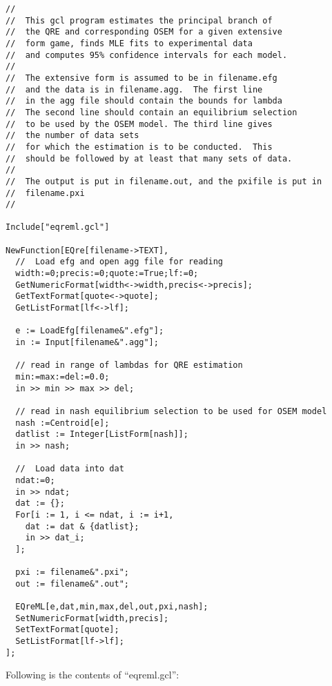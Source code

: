 {\scriptsize
\begin{verbatim}
//
//  This gcl program estimates the principal branch of
//  the QRE and corresponding OSEM for a given extensive 
//  form game, finds MLE fits to experimental data 
//  and computes 95% confidence intervals for each model. 
//
//  The extensive form is assumed to be in filename.efg
//  and the data is in filename.agg.  The first line
//  in the agg file should contain the bounds for lambda 
//  The second line should contain an equilibrium selection 
//  to be used by the OSEM model. The third line gives 
//  the number of data sets
//  for which the estimation is to be conducted.  This 
//  should be followed by at least that many sets of data.
//
//  The output is put in filename.out, and the pxifile is put in
//  filename.pxi
//

Include["eqreml.gcl"]

NewFunction[EQre[filename->TEXT],
  //  Load efg and open agg file for reading
  width:=0;precis:=0;quote:=True;lf:=0;
  GetNumericFormat[width<->width,precis<->precis];
  GetTextFormat[quote<->quote];
  GetListFormat[lf<->lf];

  e := LoadEfg[filename&".efg"];
  in := Input[filename&".agg"];

  // read in range of lambdas for QRE estimation
  min:=max:=del:=0.0;
  in >> min >> max >> del;

  // read in nash equilibrium selection to be used for OSEM model
  nash :=Centroid[e];
  datlist := Integer[ListForm[nash]];
  in >> nash;

  //  Load data into dat
  ndat:=0;
  in >> ndat;
  dat := {};
  For[i := 1, i <= ndat, i := i+1,
    dat := dat & {datlist};
    in >> dat_i;
  ];

  pxi := filename&".pxi";
  out := filename&".out";

  EQreML[e,dat,min,max,del,out,pxi,nash];
  SetNumericFormat[width,precis];
  SetTextFormat[quote];
  SetListFormat[lf->lf];
];
\end{verbatim}
}

\noindent
Following is the contents of ``eqreml.gcl'':

